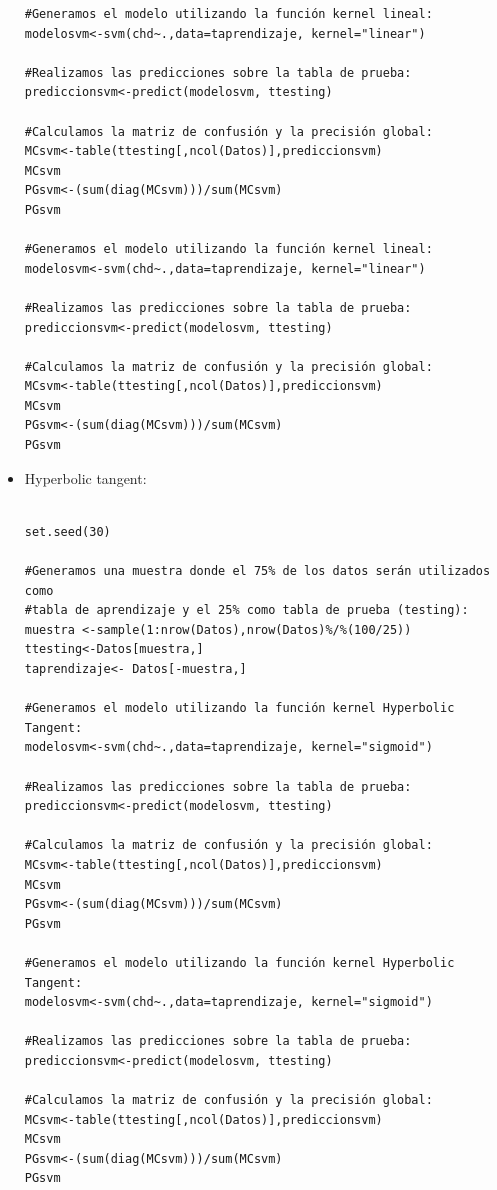 \documentclass[11pt,a4paper]{report}
\begin{document}
\begin{itemize}
\begin{verbatim}
#Generamos el modelo utilizando la función kernel lineal:
modelosvm<-svm(chd~.,data=taprendizaje, kernel="linear") 

#Realizamos las predicciones sobre la tabla de prueba:
prediccionsvm<-predict(modelosvm, ttesting) 

#Calculamos la matriz de confusión y la precisión global:
MCsvm<-table(ttesting[,ncol(Datos)],prediccionsvm) 
MCsvm
PGsvm<-(sum(diag(MCsvm)))/sum(MCsvm)
PGsvm

#Generamos el modelo utilizando la función kernel lineal:
modelosvm<-svm(chd~.,data=taprendizaje, kernel="linear") 

#Realizamos las predicciones sobre la tabla de prueba:
prediccionsvm<-predict(modelosvm, ttesting) 

#Calculamos la matriz de confusión y la precisión global:
MCsvm<-table(ttesting[,ncol(Datos)],prediccionsvm) 
MCsvm
PGsvm<-(sum(diag(MCsvm)))/sum(MCsvm)
PGsvm

\end{verbatim}
\item Hyperbolic tangent:
\begin{verbatim} 

set.seed(30)

#Generamos una muestra donde el 75% de los datos serán utilizados como 
#tabla de aprendizaje y el 25% como tabla de prueba (testing):
muestra <-sample(1:nrow(Datos),nrow(Datos)%/%(100/25)) 
ttesting<-Datos[muestra,]
taprendizaje<- Datos[-muestra,]

#Generamos el modelo utilizando la función kernel Hyperbolic Tangent:
modelosvm<-svm(chd~.,data=taprendizaje, kernel="sigmoid") 

#Realizamos las predicciones sobre la tabla de prueba:
prediccionsvm<-predict(modelosvm, ttesting) 

#Calculamos la matriz de confusión y la precisión global:
MCsvm<-table(ttesting[,ncol(Datos)],prediccionsvm) 
MCsvm
PGsvm<-(sum(diag(MCsvm)))/sum(MCsvm)
PGsvm

#Generamos el modelo utilizando la función kernel Hyperbolic Tangent:
modelosvm<-svm(chd~.,data=taprendizaje, kernel="sigmoid") 

#Realizamos las predicciones sobre la tabla de prueba:
prediccionsvm<-predict(modelosvm, ttesting) 

#Calculamos la matriz de confusión y la precisión global:
MCsvm<-table(ttesting[,ncol(Datos)],prediccionsvm) 
MCsvm
PGsvm<-(sum(diag(MCsvm)))/sum(MCsvm)
PGsvm

\end{verbatim}


\end{itemize}
\end{document}
